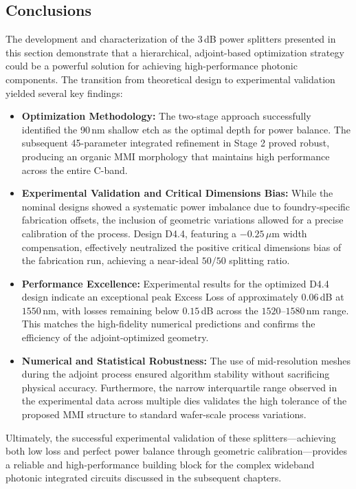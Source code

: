\subsection{Conclusions}

The development and characterization of the 3\,dB power splitters presented in this section 
demonstrate that a hierarchical, adjoint-based optimization strategy could be a powerful solution
for achieving high-performance photonic components. The transition from theoretical design to 
experimental validation yielded several key findings:

\begin{itemize}
    \item \textbf{Optimization Methodology:} The two-stage approach successfully identified the 
    90\,nm shallow etch as the optimal depth for power balance. The subsequent 45-parameter 
    integrated refinement in Stage 2 proved robust, producing an organic MMI morphology that 
    maintains high performance across the entire C-band.
    
    \item \textbf{Experimental Validation and Critical Dimensions Bias:} While the nominal designs 
    showed a systematic power imbalance due to foundry-specific fabrication offsets, the inclusion 
    of geometric variations allowed for a precise calibration of the process. Design D4.4, 
    featuring a $-0.25\,\mu$m width compensation, effectively neutralized the positive critical
    dimensions bias of the fabrication run, achieving a near-ideal $50/50$ splitting ratio.
    
    \item \textbf{Performance Excellence:} Experimental results for the optimized D4.4 
    design indicate an exceptional peak Excess Loss of approximately $0.06$\,dB at $1550$\,nm, 
    with losses remaining below $0.15$\,dB across the $1520$--$1580$\,nm range. This matches the 
    high-fidelity numerical predictions and confirms the efficiency of the adjoint-optimized 
    geometry.
    
    \item \textbf{Numerical and Statistical Robustness:} The use of mid-resolution meshes during 
    the adjoint process ensured algorithm stability without sacrificing physical accuracy. 
    Furthermore, the narrow interquartile range observed in the experimental data across multiple 
    dies validates the high tolerance of the proposed MMI structure to standard wafer-scale process 
    variations.
\end{itemize}

Ultimately, the successful experimental validation of these splitters—achieving both low loss and 
perfect power balance through geometric calibration—provides a reliable and high-performance 
building block for the complex wideband photonic integrated circuits discussed in the subsequent 
chapters.
